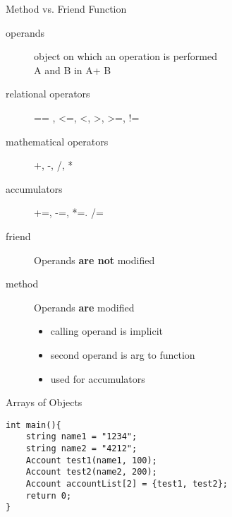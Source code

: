 \documentclass[xcolor={dvipsnames}]{beamer}
\begin{document}
\begin{frame}{Method vs. Friend Function}
	\begin{description}
		\item[operands] object on which an operation is performed\\A and B in A+ B
		\item[relational operators] == , \textless=, \textless, \textgreater, \textgreater=, !=
		\item[mathematical operators] +, -, /, *
		\item[accumulators] +=, -=, *=. /=
		\item[friend] Operands \textbf{are not} modified
		\item[method] Operands \textbf{are} modified
			\begin{itemize}
				\item calling operand is implicit
				\item second operand is arg to function
				\item used for accumulators
			\end{itemize}
		
			
	\end{description}
\end{frame}

\begin{frame}[fragile]{Arrays of Objects}
\begin{verbatim}
int main(){
    string name1 = "1234";
    string name2 = "4212";
    Account test1(name1, 100);
    Account test2(name2, 200);
    Account accountList[2] = {test1, test2};
    return 0;
}
\end{verbatim}
\end{frame}
\end{document}
